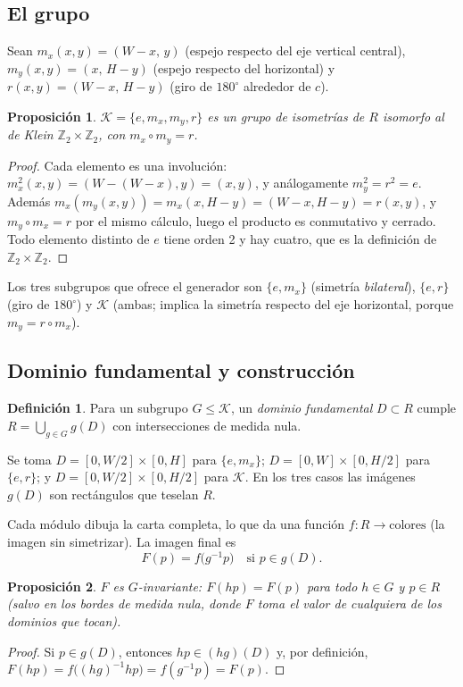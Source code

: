 \documentclass[11pt,a4paper]{article}
\theoremstyle{definition}
\newtheorem{definicion}{Definición}[section]
\theoremstyle{plain}
\newtheorem{proposicion}{Proposición}[section]
\theoremstyle{remark}
\newcommand{\Z}{\mathbb{Z}}
\newcommand{\Klein}{\mathcal{K}}
\begin{document}
\subsection{El grupo}
Sean $m_x(x,y)=(W-x,\,y)$ (espejo respecto del eje vertical central),
$m_y(x,y)=(x,\,H-y)$ (espejo respecto del horizontal) y
$r(x,y)=(W-x,\,H-y)$ (giro de $180^\circ$ alrededor de $c$).

\begin{proposicion}
$\Klein=\{e,m_x,m_y,r\}$ es un grupo de isometrías de $R$ isomorfo al de Klein
$\Z_2\times\Z_2$, con $m_x\circ m_y=r$.
\end{proposicion}
\begin{proof}
Cada elemento es una involución: $m_x^2(x,y)=(W-(W-x),y)=(x,y)$, y análogamente
$m_y^2=r^2=e$. Además $m_x(m_y(x,y))=m_x(x,H-y)=(W-x,H-y)=r(x,y)$, y $m_y\circ m_x=r$
por el mismo cálculo, luego el producto es conmutativo y cerrado. Todo elemento
distinto de $e$ tiene orden 2 y hay cuatro, que es la definición de $\Z_2\times\Z_2$.
\end{proof}

Los tres subgrupos que ofrece el generador son $\{e,m_x\}$ (simetría
\emph{bilateral}), $\{e,r\}$ (giro de $180^\circ$) y $\Klein$ (ambas; implica la
simetría respecto del eje horizontal, porque $m_y=r\circ m_x$).

\subsection{Dominio fundamental y construcción}
\begin{definicion}
Para un subgrupo $G\le\Klein$, un \emph{dominio fundamental} $D\subset R$ cumple
$R=\bigcup_{g\in G}g(D)$ con intersecciones de medida nula.
\end{definicion}

Se toma $D=[0,W/2]\times[0,H]$ para $\{e,m_x\}$; $D=[0,W]\times[0,H/2]$ para
$\{e,r\}$; y $D=[0,W/2]\times[0,H/2]$ para $\Klein$. En los tres casos las
imágenes $g(D)$ son rectángulos que teselan $R$.

Cada módulo dibuja la carta completa, lo que da una función
$f:R\to\text{colores}$ (la imagen sin simetrizar). La imagen final es
\[
  F(p)=f\bigl(g^{-1}p\bigr)\quad\text{si }p\in g(D).
\]

\begin{proposicion}
$F$ es $G$-invariante: $F(hp)=F(p)$ para todo $h\in G$ y $p\in R$ (salvo en los
bordes de medida nula, donde $F$ toma el valor de cualquiera de los dominios que
tocan).
\end{proposicion}
\begin{proof}
Si $p\in g(D)$, entonces $hp\in(hg)(D)$ y, por definición,
$F(hp)=f\bigl((hg)^{-1}hp\bigr)=f(g^{-1}p)=F(p)$.
\end{proof}
\end{document}
